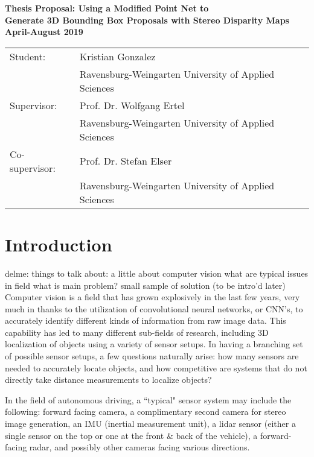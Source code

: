 \begin{center}
    \large
    \textbf{Thesis Proposal: Using a Modified Point Net to \\ Generate 3D Bounding Box Proposals with Stereo Disparity Maps}\\
    \noindent \textbf{April-August 2019}\\
    \normalsize 
\end{center}

\begin{tabular}{ll}
    Student: & Kristian Gonzalez \\
    & Ravensburg-Weingarten University of Applied Sciences\\
    Supervisor: & Prof. Dr. Wolfgang Ertel \\
    & Ravensburg-Weingarten University of Applied Sciences\\
    Co-supervisor: & Prof. Dr. Stefan Elser\\
    & Ravensburg-Weingarten University of Applied Sciences\\
\end{tabular}


\section{Introduction}
delme: things to talk about:
	a little about computer vision
	what are typical issues in field
	what is main problem?
	small sample of solution (to be intro'd later) \\
Computer vision is a field that has grown explosively in the last few years, very much in thanks to the utilization of convolutional neural networks, or CNN's, to accurately identify different kinds of information from raw image data. This capability has led to many different sub-fields of research, including 3D localization of objects using a variety of sensor setups. In having a branching set of possible sensor setups, a few questions naturally arise: how many sensors are needed to accurately locate objects, and how competitive are systems that do not directly take distance measurements to localize objects? 

In the field of autonomous driving, a ``typical" sensor system may include the following: forward facing camera, a complimentary second camera for stereo image generation, an IMU (inertial measurement unit), a lidar sensor (either a single sensor on the top or one at the front \& back of the vehicle), a forward-facing radar, and possibly other cameras facing various directions. 

